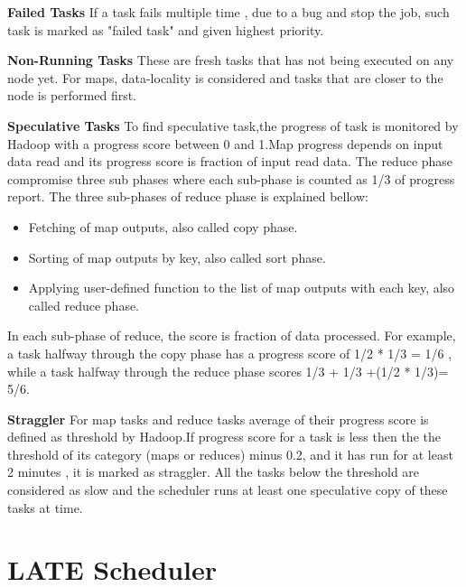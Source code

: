 \textbf{Failed Tasks }  If a task fails multiple time , due to a bug and stop the job, such task is marked as "failed task" and given highest priority. 

\textbf{Non-Running Tasks } These are fresh tasks that has not being executed on any node yet. For maps, data-locality is considered and tasks that are closer to the node is performed first. 

\textbf{Speculative Tasks } To find speculative task,the progress of task is monitored by Hadoop with a progress score between 0 and 1.Map progress depends on input data read and its progress score is fraction of input read data. The reduce phase compromise three sub phases where each sub-phase is counted as 1/3 of progress report. The three sub-phases of reduce phase is explained bellow: \\

\begin{itemize}
\item{Fetching of map outputs, also called copy phase.}
\item{Sorting of map outputs by key, also called sort phase.}
\item{Applying user-defined function to the list of map outputs with each key, also called reduce phase. }
\end{itemize}
	

In each sub-phase of reduce, the score is fraction of data processed. For example, a task halfway through the copy phase has a progress score of 1/2 * 1/3 = 1/6 , while a task halfway through the reduce phase scores 1/3 + 1/3 +(1/2 * 1/3)= 5/6.

\textbf{Straggler}  For map tasks and reduce tasks average of their progress score is defined as threshold by Hadoop.If progress score for a task is less then the the threshold of its category (maps or reduces) minus 0.2, and it has run for at least 2 minutes , it is marked as straggler. All the tasks below the threshold are considered as slow and the scheduler runs at least one speculative copy of these tasks at time\cite{mat1}. 
 





\section{LATE Scheduler}

